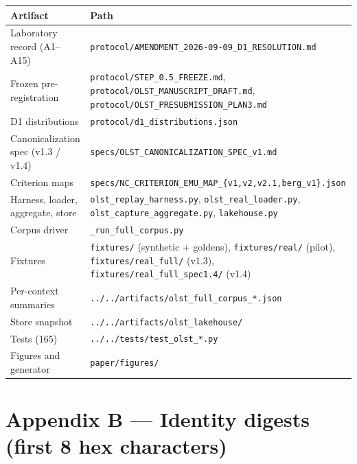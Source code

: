 \documentclass[11pt]{article}
\begin{document}
\begin{longtable}[]{@{}
  >{\raggedright\arraybackslash}p{}
  >{\raggedright\arraybackslash}p{}@{}}
\toprule\noalign{}
\begin{minipage}[b]{\linewidth}\raggedright
Artifact
\end{minipage} & \begin{minipage}[b]{\linewidth}\raggedright
Path
\end{minipage} \\
\midrule\noalign{}
\endhead
\bottomrule\noalign{}
\endlastfoot
Laboratory record (A1--A15) & \texttt{protocol/AMENDMENT\_2026-09-09\_D1\_RESOLUTION.md} \\
Frozen pre-registration & \texttt{protocol/STEP\_0.5\_FREEZE.md}, \texttt{protocol/OLST\_MANUSCRIPT\_DRAFT.md}, \texttt{protocol/OLST\_PRESUBMISSION\_PLAN3.md} \\
D1 distributions & \texttt{protocol/d1\_distributions.json} \\
Canonicalization spec (v1.3 / v1.4) & \texttt{specs/OLST\_CANONICALIZATION\_SPEC\_v1.md} \\
Criterion maps & \texttt{specs/NC\_CRITERION\_EMU\_MAP\_\{v1,v2,v2.1,berg\_v1\}.json} \\
Harness, loader, aggregate, store & \texttt{olst\_replay\_harness.py}, \texttt{olst\_real\_loader.py}, \texttt{olst\_capture\_aggregate.py}, \texttt{lakehouse.py} \\
Corpus driver & \texttt{\_run\_full\_corpus.py} \\
Fixtures & \texttt{fixtures/} (synthetic + goldens), \texttt{fixtures/real/} (pilot), \texttt{fixtures/real\_full/} (v1.3), \texttt{fixtures/real\_full\_spec1.4/} (v1.4) \\
Per-context summaries & \texttt{../../artifacts/olst\_full\_corpus\_*.json} \\
Store snapshot & \texttt{../../artifacts/olst\_lakehouse/} \\
Tests (165) & \texttt{../../tests/test\_olst\_*.py} \\
Figures and generator & \texttt{paper/figures/} \\
\end{longtable}

\section{Appendix B --- Identity digests (first 8 hex characters)}\label{appendix-b-identity-digests-first-8-hex-characters}
\end{document}
